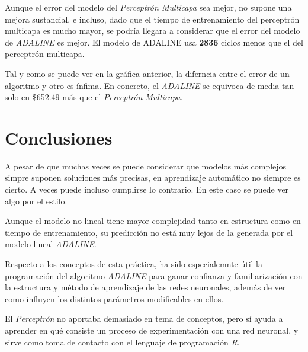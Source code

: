\documentclass{uc3mpracticas}
\begin{document}
  \vspace{4mm}

  Aunque el error del modelo del \textit{Perceptrón Multicapa} sea mejor, no supone una mejora sustancial, e incluso, dado que el tiempo de entrenamiento del perceptrón multicapa es mucho mayor, se podría llegara a considerar que el error del modelo de \textit{ADALINE} es mejor. El modelo de ADALINE usa \textbf{2836} ciclos menos que el del perceptrón multicapa.


  Tal y como se puede ver en la gráfica anterior, la diferncia entre el error de un algoritmo y otro es ínfima. En concreto, el \textit{ADALINE} se equivoca de media tan solo en \$652.49 más que el \textit{Perceptrón Multicapa}.


  \section{Conclusiones}

  A pesar de que muchas veces se puede considerar que modelos más complejos simpre suponen soluciones más precisas, en aprendizaje automático no siempre es cierto. A veces puede incluso cumplirse lo contrario. En este caso se puede ver algo por el estilo.

  \vspace{3mm}

  Aunque el modelo no lineal tiene mayor complejidad tanto en estructura como en tiempo de entrenamiento, su predicción no está muy lejos de la generada por el modelo lineal \textit{ADALINE}.

  \vspace{4mm}

  Respecto a los conceptos de esta práctica, ha sido especialemnte útil la programación del algoritmo \textit{ADALINE} para ganar confianza y familiarización con la estructura y método de aprendizaje de las redes neuronales, además de ver como influyen los distintos parámetros modificables en ellos.

  \vspace{2mm}

  El \textit{Perceptrón} no aportaba demasiado en tema de conceptos, pero sí ayuda a aprender en qué consiste un proceso de experimentación con una red neuronal, y sirve como toma de contacto con el lenguaje de programación \textit{R}.
\end{document}

